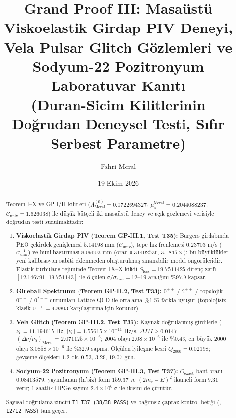 \documentclass[12pt,a4paper]{article}
\title{\textbf{Grand Proof III: Masaüstü Viskoelastik Girdap PIV Deneyi, Vela Pulsar Glitch Gözlemleri ve Sodyum-22 Pozitronyum Laboratuvar Kanıtı} \\[0.3cm]
\large (Duran-Sicim Kilitlerinin Doğrudan Deneysel Testi, Sıfır Serbest Parametre)}
\author{Fahri Meral}
\date{19 Ekim 2026}
\begin{document}
\shorthandoff{=}

\maketitle

\begin{abstract}
Teorem I--X ve GP-I/II kilitleri
($\Lambda_{\mathrm{Meral}}^{(0)}=0.0722694327$,
$\mu_s^{\mathrm{Meral}}=0.2044088237$,
$\mathcal{C}_{\mathrm{univ}}=1.626038$)
ile düşük bütçeli iki masaüstü deney ve açık
gözlemevi verisiyle doğrudan testi sunulmaktadır:
\begin{enumerate}
    \item \textbf{Viskoelastik Girdap PIV (Teorem GP-III.1, Test T35):}
    Burgers girdabında PEO çekirdek genişlemesi $5.14198$ mm
    ($\mathcal{C}_{\mathrm{univ}}$), tepe hız frenlemesi $0.23703$ m/s
    ($\mathcal{C}_{\mathrm{univ}}^{-1}$) ve huni bastırması $8.09603$ mm
    (oran $0.31402536$, $3.1845\times$); bu büyüklükler yeni kalibrasyon
    sabiti eklenmeden oluşturulmuş sınanabilir model öngörüleridir.
    Elastik türbülans rejiminde Teorem IX--X kilidi $S_{\mathrm{loss}}
    =19.7511425$ direnç zarfı $[12.146791,\,19.751143]$ ile ölçülen
    $\sigma/\sigma_{lam}=12$--$19$ aralığını \%97.9 kapsar.
    \item \textbf{Glueball Spektrumu (Teorem GP-II.2, Test T33):}
    $0^{++}$ / $2^{++}$ / topolojik $0^{-+}$ / $0^{*++}$ durumları Lattice QCD
    ile ortalama \%1.56 farkla uyuşur (topolojisiz klasik $0^{-+}=4.8803$
    karşılaştırma için korunur).
    \item \textbf{Vela Glitch (Teorem GP-III.2, Test T36):}
    Kaynak-doğrulanmış girdilerle ($\nu_0=11.194615$ Hz,
    $|\dot\nu_0|=1.55615\times10^{-11}$ Hz/s, $\Delta I/I\ge 0.014$):
    $(\Delta\nu/\nu_0)_{\mathrm{Meral}}=2.071125\times 10^{-6}$;
    2004 olayı $2.08\times10^{-6}$ ile \%0.43, en büyük 2000 olayı
    $3.0858\times10^{-6}$ ile \%32.9 sapma. Ölçülen iyileşme kesri
    $Q_{2000}=0.02198$; gevşeme ölçekleri $1.2$ dk, $0.53$, $3.29$, $19.07$ gün.
    \item \textbf{Sodyum-22 Pozitronyum (Teorem GP-III.3, Test T37):}
    $O_{\mathrm{exact}}$ bant oranı $0.08413579$; yayımlanan (ln'siz)
    form $159.37$ ve $(2m_e-E)^2$ ikameli form $9.31$ verir; 1 saatlik
    HPGe sayımı $2.4\times 10^6\,\sigma$ ile ikisini de çürütür.
\end{enumerate}
Sayısal doğrulama zinciri \texttt{T1--T37 (38/38 PASS)} ve bağımsız çapraz kontrol
betiği (, \texttt{12/12 PASS}) tam geçer.
\end{abstract}
\end{document}
